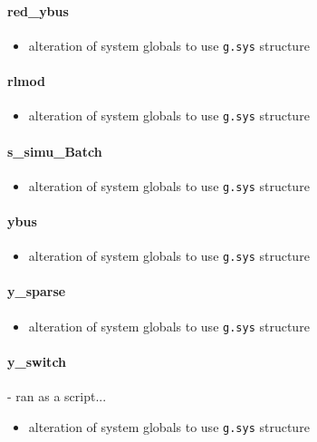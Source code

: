 \documentclass[12pt]{article}
\begin{document}
\paragraph{red\_ybus}
	\begin{itemize}
		\item alteration of system globals to use \verb|g.sys| structure
	\end{itemize}
\paragraph{rlmod}
	\begin{itemize}
		\item alteration of system globals to use \verb|g.sys| structure
	\end{itemize}
\paragraph{s\_simu\_Batch}
	\begin{itemize}
		\item alteration of system globals to use \verb|g.sys| structure
	\end{itemize}
\paragraph{ybus}
	\begin{itemize}
		\item alteration of system globals to use \verb|g.sys| structure
	\end{itemize}
\paragraph{y\_sparse}
	\begin{itemize}
		\item alteration of system globals to use \verb|g.sys| structure
	\end{itemize}
\paragraph{y\_switch} - ran as a script...
	\begin{itemize}
		\item alteration of system globals to use \verb|g.sys| structure
	\end{itemize}
\end{document}
